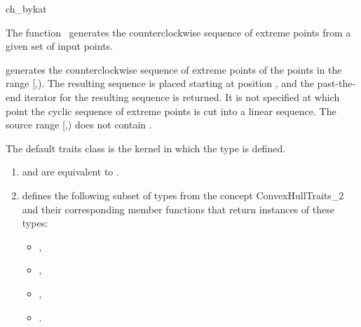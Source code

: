 
\begin{ccRefFunction}{ch_bykat}  

\ccDefinition
  
The function \ccRefName\ generates the counterclockwise sequence of extreme
points from a given set of input points.



            {generates the counterclockwise sequence of extreme points
            of the points in the range [,).
            The resulting sequence is placed starting at position
            , and the past-the-end iterator for the resulting
            sequence is returned. It is not specified at which point the
            cyclic sequence of extreme points is cut into a linear sequence.
            \ccPrecond %
            The source range [,) does not contain
            .}

The default traits class  is the kernel in which the
type  is defined.


\begin{enumerate}
   \item    {} and 
            are equivalent to .
   \item    {} defines the following subset of types from
            the concept ConvexHullTraits\_2 and their corresponding member
            functions that return instances of these types:
            \begin{itemize}
                \item {},
                \item {},
                \item {}, 
                \item {}.
            \end{itemize}
\end{enumerate}


\end{ccRefFunction}
